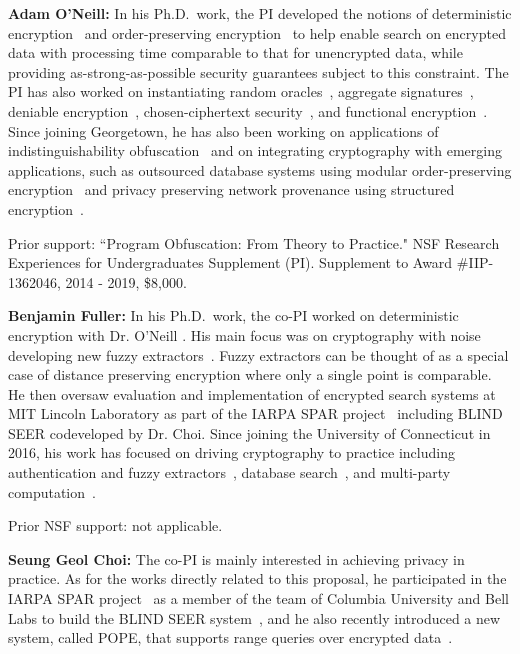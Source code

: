 \documentclass[11pt]{article}
\theoremstyle{remark}
\begin{document}
\textbf{Adam O'Neill:}
In his Ph.D.~work, the PI  developed the notions of deterministic encryption~\cite{C:BelBolOne07,ABO07,C:BolFehOne08,C:BFOR08,TCC:FulNeiRey12} and order-preserving encryption~\cite{EC:BCLO09,C:BolCheOne11} to help enable search on encrypted data with processing time comparable to that for unencrypted data, while providing as-strong-as-possible security guarantees subject to this constraint.
The PI has also worked on  instantiating random oracles~\cite{C:KilOneSmi10,TCC:GoyONeRao11,EC:LewONeSmi13},   aggregate signatures~\cite{CCS:BGOY07,AC:GLOW12}, deniable encryption~\cite{C:OnePeiWat11},  chosen-ciphertext security~\cite{EC:KilMohOne10,PKC:DFMO14}, and  functional encryption~\cite{EPRINT:ONeill10b,C:DIJOPP13, CANS:BelONe13}.   %
Since joining Georgetown, he has also been working on  applications of indistinguishability obfuscation~\cite{DGLOZ14} and on integrating cryptography with emerging applications, such as outsourced database systems using modular order-preserving encryption~\cite{SIGMOD:MCOKC15} and  privacy preserving network provenance using structured encryption~\cite{LOSZZ14}.

Prior support: ``Program Obfuscation: From Theory to Practice." NSF Research Experiences for Undergraduates Supplement (PI).
Supplement to Award \#IIP-1362046,   2014 - 2019, \$8,000.

\textbf{Benjamin Fuller:}
In his Ph.D.~work, the co-PI worked on deterministic encryption with Dr. O'Neill \cite{TCC:FulNeiRey12,JC:FulONeRey15}.  His main focus was on cryptography with noise developing new fuzzy extractors~\cite{AC:FulMenRey13,AC:FulReySmi16,EC:CFPRS16}.  Fuzzy extractors can be thought of as a special case of distance preserving encryption where only a single point is comparable.  He then oversaw evaluation and implementation of encrypted search systems at MIT Lincoln Laboratory as part of the IARPA SPAR project~\cite{spar_baa} including BLIND SEER codeveloped by Dr. Choi.  Since joining the University of Connecticut in 2016, his work has focused on driving cryptography to practice including authentication and fuzzy extractors~\cite{EPRINT:HFDD17,EPRINT:BKFY17,EPRINT:ABCFG16}, database search~\cite{SP:FVYSHG17}, and multi-party computation~\cite{EPRINT:CunFulYak16}.  

Prior NSF support: not applicable.

\textbf{Seung Geol Choi:}
The co-PI is mainly interested in achieving privacy in practice. As for the
works directly related to this proposal, he participated in the IARPA SPAR
project~\cite{spar_baa} as a member of the team of Columbia University and Bell
Labs to build the BLIND SEER system~\cite{SP:PKVKMC14}, and he also recently
introduced a new system, called POPE, that supports range queries over
encrypted data~\cite{CCS:RACY16}.  
\end{document}
